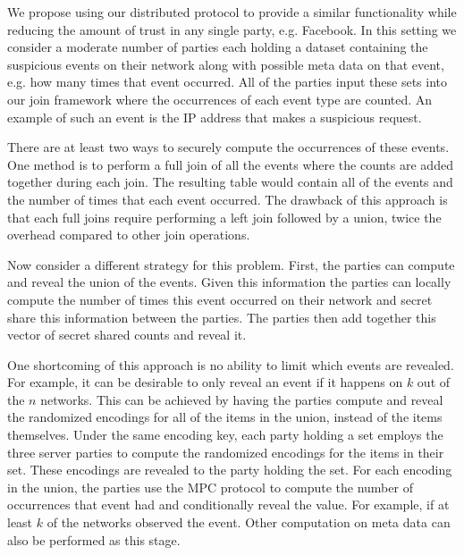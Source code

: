 \documentclass[11pt,letterpaper]{article}
\begin{document}
We propose using our distributed protocol to provide a similar functionality while reducing the amount of trust in any single party, e.g. Facebook. In this setting we consider a moderate number of parties each holding a dataset containing the suspicious events on their network along with possible meta data on that event, e.g. how many times that event occurred. All of the parties input these sets into our join framework where the occurrences  of each event type are counted. An example of such an event is the IP address that makes a suspicious request. 

There are at least two ways to securely compute the occurrences of these events. One method is to perform a full join of all the events where the counts are added together during each join. The resulting table would contain all of the events and the number of times that each event occurred. The drawback of this approach is that each full joins require performing a left join followed by a union, twice the overhead compared to other join operations.

Now consider a different strategy for this problem.  First, the parties can compute and reveal the union of the events. Given this information the parties can locally compute the number of times this event occurred on their network and secret share this information between the parties. The parties then add together this vector of secret shared counts and reveal it.


One shortcoming of this approach is no ability to limit which events are revealed. For example, it can be desirable to only reveal an event if it happens on $k$ out of the $n$ networks. This can be achieved by having the parties compute and reveal the randomized encodings for all of the items in the union, instead of the items themselves. Under the same encoding key, each party holding a set employs the three server parties to compute the randomized encodings for the items in their set. These encodings are revealed to the party holding the set. For each encoding in the union, the parties use the MPC protocol to compute the number of occurrences that event had and conditionally reveal the value. For example, if at least $k$ of the networks observed the event. Other computation on meta data can also be performed as this stage.
\end{document}
